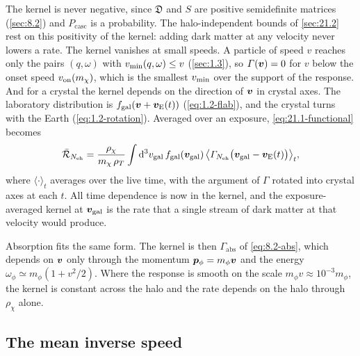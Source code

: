 The kernel is never negative, since $\mathfrak{D}$ and $S$ are positive semidefinite matrices (\cref{sec:8.2}) and $P_{\mathrm{casc}}$ is a probability. The halo-independent bounds of \cref{sec:21.2} rest on this positivity of the kernel: adding dark matter at any velocity never lowers a rate. The kernel vanishes at small speeds. A particle of speed $v$ reaches only the pairs $(q,\omega)$ with $v_{\mathrm{min}}(q,\omega) \le v$ (\cref{sec:1.3}), so $\varGamma(\bm{v}) = 0$ for $v$ below the onset speed $v_{\mathrm{on}}(m_{\chi})$, which is the smallest $v_{\mathrm{min}}$ over the support of the response. And for a crystal the kernel depends on the direction of $\bm{v}$ in crystal axes. The laboratory distribution is $f_{\mathrm{gal}}(\bm{v} + \bm{v}_{\mathrm{E}}(t))$ (\cref{eq:1.2-flab}), and the crystal turns with the Earth (\cref{eq:1.2-rotation}). Averaged over an exposure, \cref{eq:21.1-functional} becomes
\begin{equation}
  \bar{\mathcal{R}}_{N_{\mathrm{eh}}} = \frac{\rho_\chi}{m_{\chi}\,\rho_T}\int\mathrm{d}^3v_{\mathrm{gal}}\,f_{\mathrm{gal}}(\bm{v}_{\mathrm{gal}})\,\bigl\langle\varGamma_{N_{\mathrm{eh}}}\bigl(\bm{v}_{\mathrm{gal}} - \bm{v}_{\mathrm{E}}(t)\bigr)\bigr\rangle_t ,
  \label{eq:21.1-exposure}
\end{equation}
where $\langle\cdot\rangle_t$ averages over the live time, with the argument of $\varGamma$ rotated into crystal axes at each $t$. All time dependence is now in the kernel, and the exposure-averaged kernel at $\bm{v}_{\mathrm{gal}}$ is the rate that a single stream of dark matter at that velocity would produce.

Absorption fits the same form. The kernel is then $\varGamma_{\mathrm{abs}}$ of \cref{eq:8.2-abs}, which depends on $\bm{v}$ only through the momentum $\bm{p}_\phi = m_\phi\bm{v}$ and the energy $\omega_\phi \simeq m_\phi(1 + v^2/2)$. Where the response is smooth on the scale $m_\phi v \approx 10^{-3}m_\phi$, the kernel is constant across the halo and the rate depends on the halo through $\rho_\chi$ alone.

\subsection{The mean inverse speed}\label{sec:21.1-eta}

